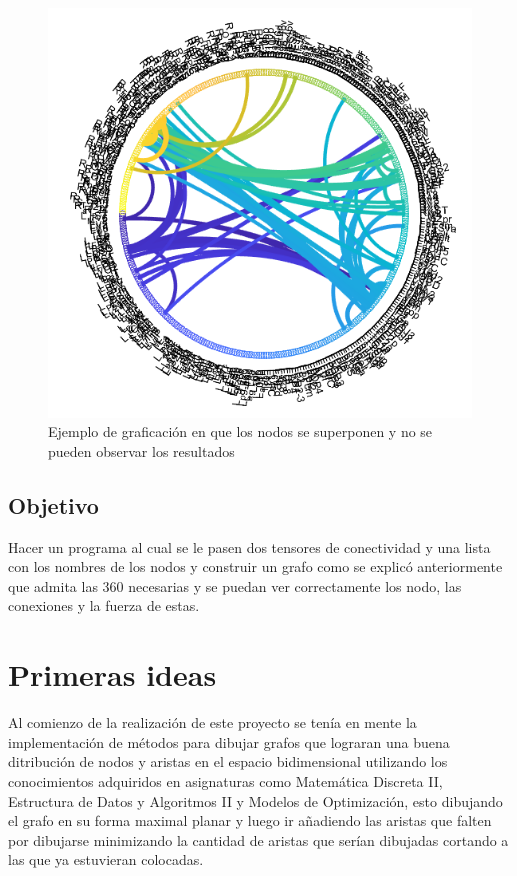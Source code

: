 \documentclass[spanish]{article}
\begin{document}
\begin{figure}[h]
\includegraphics[scale=0.3]{example2.png}%
\caption{Ejemplo de graficación en que los nodos se superponen y no se pueden observar los resultados}
\end{figure}
 
 
\subsection*{Objetivo}
Hacer un programa al cual se le pasen dos tensores de conectividad y una lista con los nombres de los nodos y construir un grafo como se explicó anteriormente que admita las 360 necesarias y se puedan ver correctamente los nodo, las conexiones y la fuerza de estas.

\section*{Primeras ideas}

Al comienzo de la realización de este proyecto se tenía en mente la implementación de métodos para dibujar grafos que lograran una buena ditribución de nodos y aristas en el espacio bidimensional utilizando los conocimientos adquiridos en asignaturas como Matemática Discreta II, Estructura de Datos y Algoritmos II y Modelos de Optimización, esto dibujando el grafo en su forma maximal planar y luego ir añadiendo las aristas que falten por dibujarse  minimizando la cantidad de aristas que serían dibujadas cortando a las que ya estuvieran colocadas. \\
\end{document}

